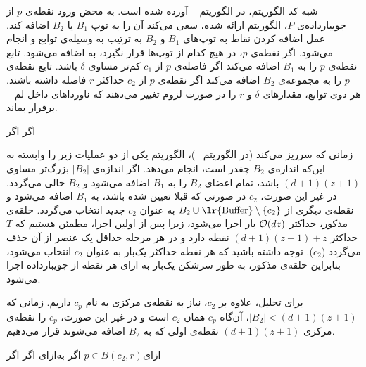 شبه کد الگوریتم، در الگوریتم ~ آورده شده است. به محض ورود نقطه‌ی $p$ از جویبارداده‌ی $P$، الگوریتم ارائه شده، سعی می‌کند آن را به توپ $B_1$ یا $B_2$ اضافه کند. عمل اضافه کردن نقاط به توپ‌های $B_1$ و $B_2$ به ترتیب به وسیله‌ی توابع  و  انجام می‌شود. اگر نقطه‌ی $p$، در هیچ کدام از توپ‌ها قرار نگیرد، به  اضافه می‌شود. تابع  نقطه‌ی $p$ را به $B_1$ اضافه می‌کند اگر فاصله‌ی $p$ از $c_1$ کم‌تر مساوی $\delta$ باشد. تابع  نقطه‌ی $p$ را به مجموعه‌ی $B_2$ اضافه می‌کند اگر نقطه‌ی $p$ از $c_2$ حداکثر $r$ فاصله داشته باشند. هر دوی توابع، مقدارهای $\delta$ و $r$ را در صورت لزوم تغییر می‌دهند که ناورداها‌ی داخل لم ~ برقرار بماند.


‌اگر{}
‌اگر{}

زمانی که  سرریز می‌کند (در الگوریتم  ~)، الگوریتم یکی از دو عملیات زیر را وابسته به این‌که اندازه‌ی $B_2$ چقدر است، انجام می‌دهد. اگر اندازه‌ی $|B_2|$ بزرگ‌تر مساوی $(d+1)(z+1)$ باشد، تمام اعضای $B_2$ را به $B_1$ اضافه می‌شود و $B_2$ خالی می‌گردد. در غیر این صورت، $c_2$ در صورتی که قبلا تعیین شده باشد، به $B_1$ اضافه می‌شود و نقطه‌ی دیگری از $B_2 \cup \text{\lr{Buffer}} \setminus \set{c_2}$ به عنوان $c_2$ جدید انتخاب می‌گردد. حلقه‌ی مذکور، حداکثر $\mathcal{O}(dz)$ بار اجرا می‌شود، زیرا پس از اولین اجرا، مطمئن هستیم که $T$ حداکثر $(d+1)(z+1) + z$ نقطه دارد و در هر مرحله حداقل یک عنصر از آن حذف می‌گردد ($c_2$). توجه داشته باشید که هر نقطه حداکثر یک‌بار به عنوان $c_2$ انتخاب می‌شود، بنابراین حلقه‌ی مذکور، به طور سرشکن یک‌بار به ازای هر نقطه از جویبارداده اجرا می‌شود.

برای تحلیل، علاوه بر $c_2$، نیاز به نقطه‌ی مرکزی به نام $c_p$ داریم. زمانی که $|B_2| < (d+1)(z+1)$، آن‌گاه $c_p$ همان $c_2$ است و در غیر این صورت، $c_p$ را نقطه‌ی مرکزی $(d+1)(z+1)$ نقطه‌ی اولی که به $B_2$ اضافه می‌شوند قرار می‌دهیم.

‌ازای{$p \in B(c_2, r)$}
‌اگر{}
‌به‌ازای{}
‌اگر{}
‌اگر{}

